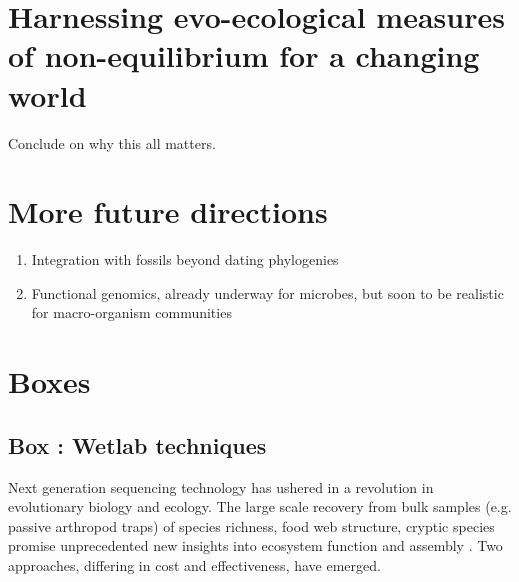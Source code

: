 \documentclass[12pt]{article}
\newcounter{Box}
\begin{document}
\section{Harnessing evo-ecological measures of non-equilibrium for a changing world}

Conclude on why this all matters.

\section{More future directions} \label{sec:future}

\begin{enumerate}
\item Integration with fossils beyond dating phylogenies
\item Functional genomics, already underway for microbes, but soon to
  be realistic for macro-organism communities
\end{enumerate}

\pagebreak




\pagebreak

\section*{Boxes}


\label{box:wet}
\subsection*{Box \theBox: Wetlab techniques}

    
Next generation sequencing technology has ushered in a revolution in
evolutionary biology and ecology. The large scale recovery from bulk
samples (e.g. passive arthropod traps) of species richness, food web
structure, cryptic species promise unprecedented new insights into
ecosystem function and assembly \citep{krehenwinkel2016,
  shokralla2015, gibson2014, taberlet2012}.  Two approaches, differing
in cost and effectiveness, have emerged.
\end{document}
